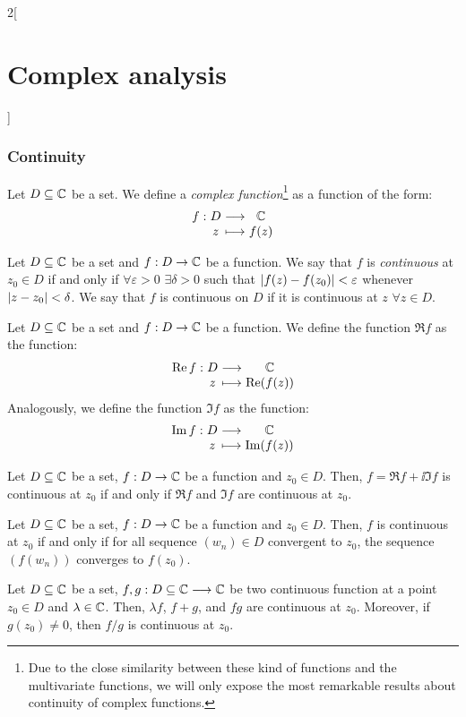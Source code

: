 \documentclass[../../../main.tex]{subfiles}
\begin{document}
\begin{multicols}{2}[\section{Complex analysis}]
  \subsubsection{Continuity}
  \begin{definition}
    Let $D \subseteq \mathbb{C}$ be a set. We define a \textit{complex function}\footnote{Due to the close similarity between these kind of functions and the multivariate functions, we will only expose the most remarkable results about continuity of complex functions.} as a function of the form:
    $$\function{f}{D}{\CC}{z}{f(z)}$$
  \end{definition}
  \begin{definition}
    Let $D \subseteq \mathbb{C}$ be a set and $f:D\rightarrow\mathbb{C}$ be a function. We say that $f$ is \emph{continuous} at $z_0\in D$ if and only if $\forall \varepsilon>0$ $\exists\delta>0$ such that $\abs{f(z)-f(z_0)}<\varepsilon$ whenever $\abs{z-z_0}<\delta$. We say that $f$ is continuous on $D$ if it is continuous at $z$ $\forall z\in D$.
  \end{definition}
  \begin{definition}
    Let $D \subseteq \mathbb{C}$ be a set and $f:D\rightarrow\mathbb{C}$ be a function. We define the function $\Re f$ as the function: $$\function{\Re f}{D}{\CC}{z}{\Re(f(z))}$$
    Analogously, we define the function $\Im f$ as the function: $$\function{\Im f}{D}{\CC}{z}{\Im(f(z))}$$
  \end{definition}
  \begin{proposition}
    Let $D \subseteq \mathbb{C}$ be a set, $f:D\rightarrow\mathbb{C}$ be a function and $z_0 \in D$. Then, $f = \Re f + \ii \Im f$ is continuous at $z_0$ if and only if $\Re f$ and $\Im f$ are continuous at $z_0$.
  \end{proposition}
  \begin{proposition}
    Let $D \subseteq \mathbb{C}$ be a set, $f:D\rightarrow\mathbb{C}$ be a function and $z_0 \in D$. Then, $f$ is continuous at $z_0$ if and only if for all sequence $(w_n)\in D$ convergent to $z_0$, the sequence $(f(w_n))$ converges to $f(z_0)$.
  \end{proposition}
  \begin{proposition}
    Let $D \subseteq \mathbb{C}$ be a set, $f,g:D \subseteq \mathbb{C} \longrightarrow \mathbb{C}$ be two continuous function at a point $z_0 \in D$ and $\lambda \in \mathbb{C}$. Then, $\lambda f$, $f+g$, and $fg$ are continuous at $z_0$. Moreover, if $g(z_0) \neq 0$, then $f/g$ is continuous at $z_0$.
  \end{proposition}

\end{multicols}
\end{document}
